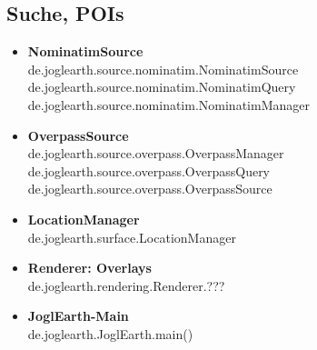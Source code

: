 \documentclass[10pt]{scrreprt}
\begin{document}
\subsection*{Suche, POIs}
\begin{itemize}
\item \textbf{NominatimSource}\\
de.joglearth.source.nominatim.NominatimSource\\
de.joglearth.source.nominatim.NominatimQuery\\
de.joglearth.source.nominatim.NominatimManager
\item \textbf{OverpassSource}\\
de.joglearth.source.overpass.OverpassManager\\
de.joglearth.source.overpass.OverpassQuery\\
de.joglearth.source.overpass.OverpassSource
\item \textbf{LocationManager}\\
de.joglearth.surface.LocationManager
\item \textbf{Renderer: Overlays}\\
de.joglearth.rendering.Renderer.???
\item \textbf{JoglEarth-Main}\\
de.joglearth.JoglEarth.main()
\end{itemize}
\end{document}
